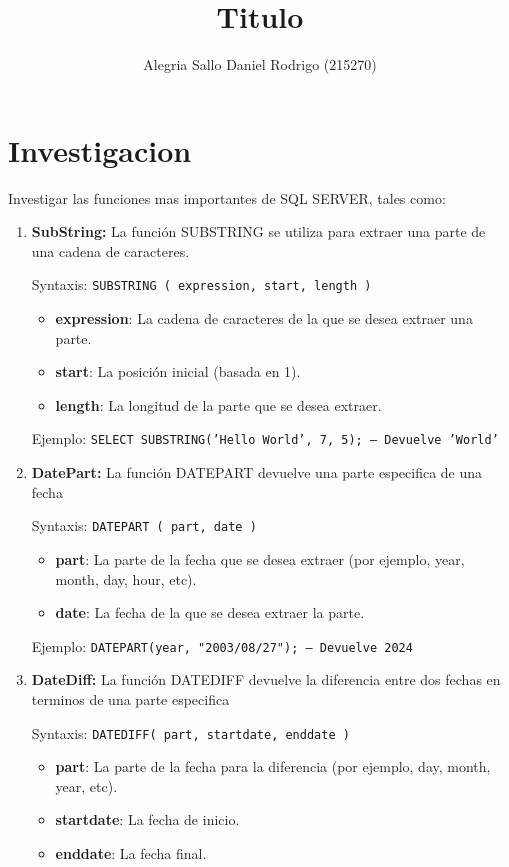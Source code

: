\documentclass[a4paper,openany,11pt]{article}
\title{Titulo}
\author{Alegria Sallo Daniel Rodrigo (215270)}
\newcommand\skiplines[1]{\vspace{#1\baselineskip}}
\begin{document}
\maketitle
\section[5.1]{Investigacion}
Investigar las funciones mas importantes de SQL SERVER, tales como:

\begin{enumerate}
    \item \textbf{SubString:}
        La función SUBSTRING se utiliza para extraer una parte de una cadena de caracteres.

        Syntaxis: \texttt{SUBSTRING ( expression, start, length )}
        \begin{itemize}
            \item \textbf{expression}: La cadena de caracteres de la que se
                desea extraer una parte.
            \item \textbf{start}: La posición inicial (basada en 1).
            \item \textbf{length}: La longitud de la parte que se desea extraer.
        \end{itemize}

        Ejemplo: \texttt{SELECT SUBSTRING('Hello World', 7, 5); -- Devuelve 'World'}

    \skiplines{1}
    \item \textbf{DatePart:}
        La función DATEPART devuelve una parte especifica de una fecha

        Syntaxis: \texttt{DATEPART ( part, date )}
        \begin{itemize}
            \item \textbf{part}: La parte de la fecha que se desea extraer (por
                ejemplo, year, month, day, hour, etc).
            \item \textbf{date}: La fecha de la que se desea extraer la parte.
        \end{itemize}

        Ejemplo: \texttt{DATEPART(year, "2003/08/27"); -- Devuelve 2024}

    \skiplines{1}
    \item \textbf{DateDiff:}
        La función DATEDIFF devuelve la diferencia entre dos fechas en terminos
        de una parte especifica

        Syntaxis: \texttt{DATEDIFF( part, startdate, enddate )}
        \begin{itemize}
            \item \textbf{part}: La parte de la fecha para la diferencia (por
                ejemplo, day, month, year, etc).
            \item \textbf{startdate}: La fecha de inicio.
            \item \textbf{enddate}: La fecha final.
        \end{itemize}


\end{enumerate}
\end{document}
